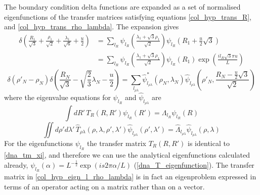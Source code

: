 The boundary condition delta functions are expanded as a set of normalised eigenfunctions of the transfer matrices satisfying equations \eqref{col_hyp_trans_R}, and \eqref{col_hyp_trans_rho_lambda}. The expansion gives
%
\begin{align}
\label{col_hyp_bc_r}
\delta\left(\frac{R_1}{\sqrt{3}} + \frac{\rho_1}{\sqrt{2}} + \frac{\lambda_1}{\sqrt{6}}+\frac{u}{2}\right)&=\sum_{l_R}\psi_{l_R}\left(\frac{\lambda_1 + \sqrt{3}\rho_1}{\sqrt{2}}\right)\psi_{l_R}\left(R_{1}+\frac{u}{2}\sqrt{3}\right)\nonumber\\
&=\sum_{l_R}\psi_{l_R}\left(\frac{\lambda_1 + \sqrt{3}\rho_1}{\sqrt{2}}\right)\psi_{l_R}\left(R_{1}\right)\exp\left(\frac{il_R\sqrt{3}\pi u}{L}\right)
\end{align}
%
\begin{equation}
\label{col_hyp_bc_rho_lambda}
\delta\left(\rho'_N-\rho_N\right)\delta\left(\frac{R_N}{\sqrt{3}} - \sqrt{\frac{2}{3}}\lambda_N-\frac{u}{2}\right)=\sum_{l_{\rho\lambda}}\hat{\psi}^{*}_{l_{\rho\lambda}}\left(\rho_{N},\lambda_{N}\right)\hat{\psi}_{l_{\rho\lambda}}\left(\rho'_{N},\frac{R_N-\frac{u}{2}\sqrt{3}}{\sqrt{2}}\right)
\end{equation}
%
where the eigenvalue equations for $\psi_{l_{R}}$ and $\hat{\psi}_{l_{\rho\lambda}}$ are
%
\begin{equation}\label{col_hyp_eign_l_r}
\int dR'\,T_{R}\left(R,R'\right)\psi_{l_{R}}\left(R'\right) = \Lambda_{l_{R}}\psi_{l_{R}}\left(R\right)
\end{equation}
%
\begin{equation}\label{col_hyp_eign_l_rho_lambda}
\iint d\rho'd\lambda'\,\hat{T}_{\rho\lambda}\left(\rho,\lambda,\rho',\lambda'\right)\hat{\psi}_{l_{\rho\lambda}}\left(\rho',\lambda'\right) = \hat{\Lambda}_{l_{\rho\lambda}}\hat{\psi}_{l_{\rho\lambda}}\left(\rho,\lambda\right)
\end{equation}
%
For the eigenfunctions $\psi_{l_{R}}$ the transfer matrix $T_{R}\left(R,R'\right)$ is identical to \eqref{dna_tm_xi}, and therefore we can use the analytical eigenfunctions calculated already, $\psi_{l_R}\left(\alpha\right)=L^{-\frac{1}{2}}\exp(is2\pi \alpha/L)$ (\eqref{dna_T_eigenfunction}). The transfer matrix in \eqref{col_hyp_eign_l_rho_lambda} is in fact an eigenproblem expressed in terms of an operator acting on a matrix rather than on a vector.
%

